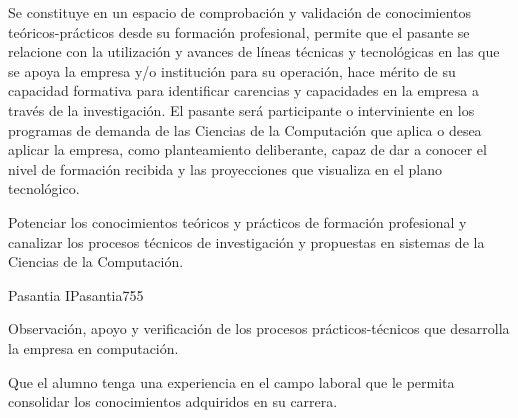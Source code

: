 \begin{syllabus}


\begin{justification}
Se constituye en un espacio de comprobación y validación de conocimientos teóricos-prácticos desde su formación profesional, permite que el pasante se relacione con la utilización y avances de líneas técnicas y tecnológicas en las que se apoya la empresa y/o institución para su operación, hace mérito de su capacidad formativa para identificar carencias y capacidades en la empresa a través de la investigación. El pasante será participante o interviniente en los programas de demanda de las Ciencias de la Computación que aplica o desea aplicar la empresa, como planteamiento deliberante, capaz de dar a conocer el nivel de formación recibida y las proyecciones que visualiza en el plano tecnológico.  
\end{justification}

\begin{goals}
\item Potenciar los conocimientos teóricos y prácticos de formación profesional y 
canalizar los procesos técnicos de investigación y propuestas en sistemas de la 
Ciencias de la Computación. 
\end{goals}

\begin{outcomes}
\end{outcomes}

\begin{unit}{Pasantia I}{Pasantia}{75}{5}
   \begin{topics}
      \item Observación, apoyo y verificación de los procesos prácticos-técnicos que desarrolla la empresa en computación.
   \end{topics}

   \begin{unitgoals}
      \item Que el alumno tenga una experiencia en el campo laboral que le permita consolidar los conocimientos adquiridos en su carrera.
   \end{unitgoals}
\end{unit}
   
\begin{coursebibliography}
\end{coursebibliography}
\end{syllabus}
